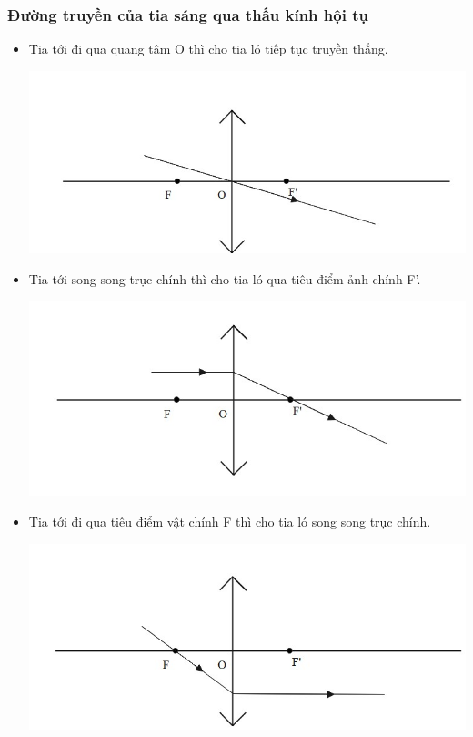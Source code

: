 \subsubsection{ Đường truyền của tia sáng qua  thấu kính hội tụ}
\begin{itemize}
	\item Tia tới đi qua quang tâm O thì cho tia ló tiếp tục truyền thẳng.
	\begin{center}
		\includegraphics[scale=0.7]{../figs/VN11-PH-38-L-026-2-h19.jpg}
	\end{center}
	\item Tia tới song song trục chính thì cho tia ló qua tiêu điểm ảnh chính F'.
		\begin{center}
		\includegraphics[scale=0.7]{../figs/VN11-PH-38-L-026-2-h20.jpg}
	\end{center}
	 \item Tia tới đi qua tiêu điểm vật chính F thì cho tia ló song song trục chính. 
	 	\begin{center}
	 	\includegraphics[scale=0.7]{../figs/VN11-PH-38-L-026-2-h21.jpg}
	 \end{center}
\end{itemize}

